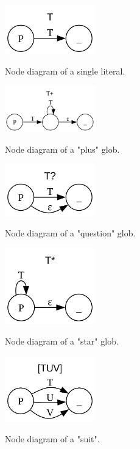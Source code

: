 \documentclass[8pt]{amsart}
\begin{document}
\begin{figure}[h]
    \caption{Node diagram of a single literal.}
    \centering
    \includegraphics[width=0.35\textwidth]
        {diagrams/base}
    \label{fig:literal_nd}
\end{figure}

\begin{figure}[h]
    \caption{Node diagram of a "plus" glob.}
    \centering
    \includegraphics[width=0.35\textwidth]
        {diagrams/plus}
    \label{fig:plus_nd}
\end{figure}

\begin{figure}[h]
    \caption{Node diagram of a "question" glob.}
    \centering
    \includegraphics[width=0.35\textwidth]
        {diagrams/question}
    \label{fig:question_nd}
\end{figure}

\begin{figure}[h]
    \caption{Node diagram of a "star" glob.}
    \centering
    \includegraphics[width=0.35\textwidth]
        {diagrams/star}
    \label{fig:star_nd}
\end{figure}

\begin{figure}[h]
    \caption{Node diagram of a "suit".}
    \centering
    \includegraphics[width=0.35\textwidth]
        {diagrams/suit}
    \label{fig:suit_nd}
\end{figure}
\end{document}
